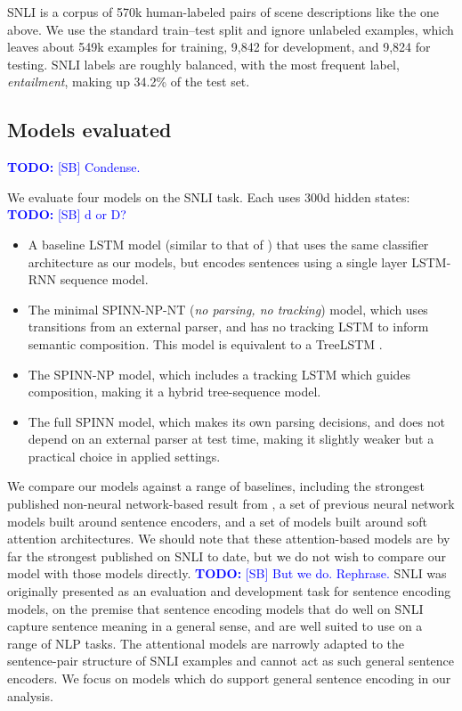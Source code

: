 \documentclass[11pt]{article}
\newcommand\todo[1]{\textcolor{blue}{\textbf{TODO:} #1}}
\begin{document}
SNLI is a corpus of 570k human-labeled pairs of scene descriptions like the one above. We use the standard train--test split and ignore unlabeled examples, which leaves about 549k examples for training, 9,842 for development, and 9,824 for testing. SNLI labels are roughly balanced, with the most frequent label, {\it entailment}, making up 34.2\% of the test set.


\subsection{Models evaluated} \todo{[SB] Condense.}

We evaluate four models on the SNLI task. Each uses 300d hidden states: \todo{[SB] d or D?}
\begin{itemize}
\item A baseline LSTM model (similar to that of \citet{snli:emnlp2015}) that uses the same classifier architecture as our models, but encodes sentences using a single layer LSTM-RNN sequence model.
\item The minimal SPINN-NP-NT (\textit{no parsing, no tracking}) model, which uses transitions from an external parser, and has no tracking LSTM to inform semantic composition. This model is equivalent to a TreeLSTM \citep{tai2015improved}.
\item The SPINN-NP model, which includes a tracking LSTM which guides composition, making it a hybrid tree-sequence model.
\item The full SPINN model, which makes its own parsing decisions, and does not depend on an external parser at test time, making it slightly weaker but a practical choice in applied settings.
\end{itemize}

We compare our models against a range of baselines, including the strongest published non-neural network-based result from \citep{snli:emnlp2015}, a set of previous neural network models built around sentence encoders, and a set of models built around soft attention architectures. We should note that these attention-based models are by far the strongest published on SNLI to date, but we do not wish to compare our model with those models directly. \todo{[SB] But we do. Rephrase.} SNLI was originally presented as an evaluation and development task for sentence encoding models, on the premise that sentence encoding models that do well on SNLI capture sentence meaning in a general sense, and are well suited to use on a range of NLP tasks. The attentional models are narrowly adapted to the sentence-pair structure of SNLI examples and cannot act as such general sentence encoders. We focus on models which do support general sentence encoding in our analysis.
\end{document}
